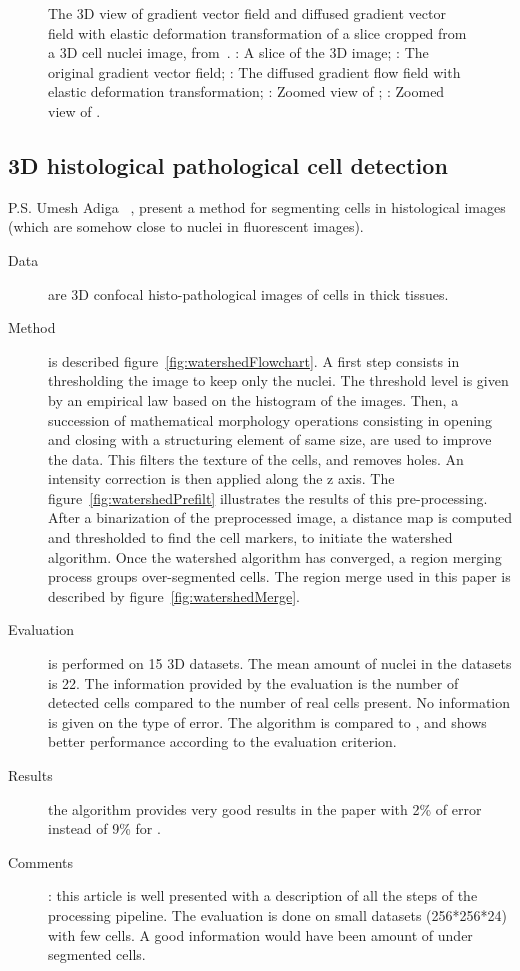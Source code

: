 \begin{figure}[h]
\caption{%
The 3D view of gradient vector field and diffused gradient vector field with elastic deformation transformation of a slice cropped from a 3D cell nuclei image, from~\cite{li20073}.
: A slice of the 3D image;
: The original gradient vector field;
: The diffused gradient flow field with elastic deformation transformation;
: Zoomed view of ;
: Zoomed view of .}
\label{fig:gradientflowFlowfield}
\end{figure}
\clearpage

\subsection*{3D histological pathological cell detection}
 P.S. Umesh Adiga {\etal}~\cite{umesh2001efficient}, present a method for segmenting cells in histological images 
  (which are somehow close to nuclei in fluorescent images).
  \begin{description}
  \item[Data] are 3D confocal histo-pathological images of cells in thick tissues.
  \item[Method] is described figure~\ref{fig:watershedFlowchart}.
  A first step consists in thresholding the image to keep only the nuclei. The threshold level is given by an empirical law based on the histogram of the images.
  Then, a succession of mathematical morphology operations consisting in opening and closing with a structuring element of same size, are used to improve the data. 
  This filters the texture of the cells, and removes holes.
  An intensity correction is then applied along the z axis. The figure~\ref{fig:watershedPrefilt} illustrates the results of this pre-processing.
  After a binarization of the preprocessed image, a distance map is computed and thresholded to find the cell markers, to initiate the watershed algorithm.
  Once the watershed algorithm has converged, a region merging process groups over-segmented cells. The region merge used in this paper is described by figure~\ref{fig:watershedMerge}.
  \item[Evaluation] is performed on 15 3D datasets. The mean amount of nuclei in the datasets is 22. The information provided by the evaluation is the number of detected cells compared to the number of real cells present. No information is given on the type of error. The algorithm is compared to \cite{malpica1997applying}, and shows better performance according to the evaluation criterion.
  \item[Results] the algorithm provides very good results in the paper with 2\% of error instead of 9\% for \cite{malpica1997applying}.
  \item[Comments]: this article is well presented with a description of all the steps of the processing pipeline.
  The evaluation is done on small datasets (256*256*24) with few cells. A good information would have been amount of under segmented cells. 
\end{description}
